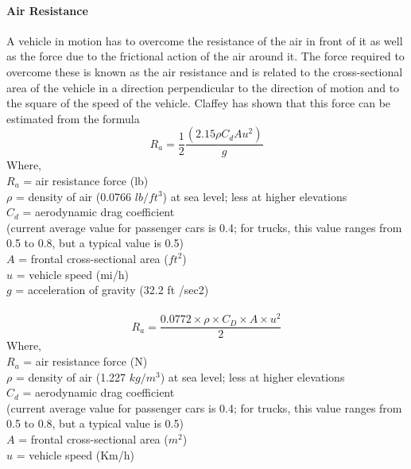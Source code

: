 \paragraph{Air Resistance}
A vehicle in motion has to overcome the resistance of the air in front of it as well as the force due to the frictional action of the air around it. The force required to overcome these is known as the air resistance and is related to the cross-sectional area of the vehicle in a direction perpendicular to the direction of motion and to the square of the speed of the vehicle. Claffey has shown that this force can be estimated from the formula
\begin{equation}
	R_a = \frac{1}{2}\frac{(2.15\rho C_d A u^2)}{g}
\end{equation}
Where,\\
\hspace*{10mm}$R_a$ = air resistance force (lb)\\
\hspace*{10mm}$\rho$ = density of air (0.0766 $ lb/ft^3 $) at sea level; less at higher elevations\\
\hspace*{10mm}$C_d$ = aerodynamic drag coefficient\\
\hspace*{10mm}(current average value for passenger cars is 0.4; for trucks, this value ranges from 0.5 to 0.8, but a typical value is 0.5)\\
\hspace*{10mm}$A$ = frontal cross-sectional area ($ ft^2 $)\\
\hspace*{10mm}$u$ = vehicle speed (mi/h)\\
\hspace*{10mm}$g$ = acceleration of gravity (32.2 ft /sec2)\\\\
\begin{equation}
	R_a = \frac{0.0772 \times \rho \times C_D \times A \times u^2}{2}
\end{equation}
Where,\\
\hspace*{10mm}$R_a$ = air resistance force (N)\\
\hspace*{10mm}$\rho$ = density of air (1.227 $ kg/m^3 $) at sea level; less at higher elevations\\
\hspace*{10mm}$C_d$ = aerodynamic drag coefficient\\
\hspace*{10mm}(current average value for passenger cars is 0.4; for trucks, this value ranges from 0.5 to 0.8, but a typical value is 0.5)\\
\hspace*{10mm}$A$ = frontal cross-sectional area ($ m^2 $)\\
\hspace*{10mm}$u$ = vehicle speed (Km/h)
